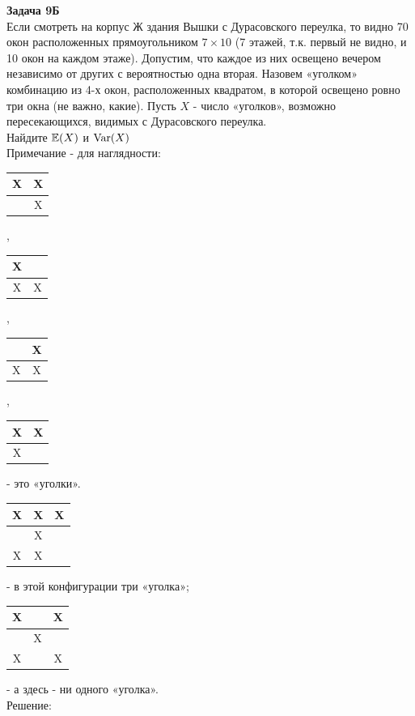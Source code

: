 \documentclass[12pt, a4paper]{article}\usepackage[]{graphicx}\usepackage[]{color}
\begin{document}
\textbf{Задача 9Б} \\
Если смотреть на корпус Ж здания Вышки с Дурасовского переулка, то видно 70 окон расположенных прямоугольником $7\times 10$ (7 этажей, т.к. первый не видно, и 10 окон на каждом этаже). Допустим, что каждое из них освещено вечером независимо от других с вероятностью одна вторая. Назовем «уголком» комбинацию из 4-х окон, расположенных квадратом, в которой освещено ровно три окна (не важно, какие). Пусть $X$ - число «уголков», возможно пересекающихся, видимых с Дурасовского переулка. \\
Найдите  $\mathbb{E}(X)$ и $\operatorname{Var}(X)$ \\
Примечание - для наглядности: \\
\begin{tabular}{|c|c|}
  \hline
  X & X\\
  \hline
    & X \\
  \hline
\end{tabular},
\begin{tabular}{|c|c|}
  \hline
  X & \\
  \hline
  X & X \\
  \hline
\end{tabular},
\begin{tabular}{|c|c|}
  \hline
   & X\\
  \hline
  X & X \\
  \hline
\end{tabular},
\begin{tabular}{|c|c|}
  \hline
  X & X\\
  \hline
  X &  \\
  \hline
\end{tabular} - это «уголки». \\
\begin{tabular}{|c|c|c|}
  \hline
  X & X & X\\
  \hline
    & X & \\
  \hline
  X & X & \\
  \hline

\end{tabular} - в этой конфигурации три «уголка»;
\begin{tabular}{|c|c|c|}
  \hline
  X &  & X\\
  \hline
    & X & \\
  \hline
  X &  & X\\
  \hline

\end{tabular} - а здесь - ни одного «уголка». \\
Решение: \\
\end{document}
